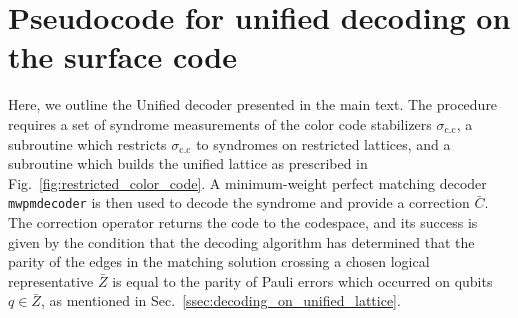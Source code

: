 \documentclass[a4paper,twocolumn,11pt,accepted=2024-12-23]{quantumarticle}
\begin{document}



\onecolumn
\newpage
\appendix

\section{Pseudocode for unified decoding on the surface code}

Here, we outline the Unified decoder presented in the main text. The procedure requires a set of syndrome measurements of the color code stabilizers $\sigma_{\textrm{c.c}}$, a subroutine which restricts $\sigma_{\textrm{c.c}}$ to syndromes on restricted lattices, and a subroutine which builds the unified lattice as prescribed in Fig.~\ref{fig:restricted_color_code}. A minimum-weight perfect matching decoder \texttt{mwpmdecoder} is then used to decode the syndrome and provide a correction $\bar{C}$. The correction operator returns the code to the codespace, and its success is given by the condition that the decoding algorithm has determined that the parity of the edges in the matching solution crossing a chosen logical representative $\bar{Z}$ is equal to the parity of Pauli errors which occurred on qubits $q \in \bar{Z}$, as mentioned in Sec.~\ref{ssec:decoding_on_unified_lattice}.
\end{document}
